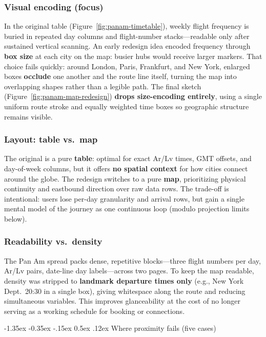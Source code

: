 \documentclass[11pt]{article}
\makeatletter
\renewcommand\subsection{\@startsection{subsection}{2}{\z@}%
  {-1.35ex \@plus -0.35ex \@minus -.15ex}%
  {0.5ex \@plus .12ex}%
  {\normalfont\large\bfseries}}
\makeatother
\begin{document}
\subsubsection{Visual encoding (focus)}

In the original table (Figure~\ref{fig:panam-timetable}), weekly flight frequency is buried in repeated day columns and flight-number stacks---readable only after sustained vertical scanning. An early redesign idea encoded frequency through \textbf{box size} at each city on the map: busier hubs would receive larger markers. That choice fails quickly: around London, Paris, Frankfurt, and New York, enlarged boxes \textbf{occlude} one another and the route line itself, turning the map into overlapping shapes rather than a legible path. The final sketch (Figure~\ref{fig:panam-map-redesign}) \textbf{drops size-encoding entirely}, using a single uniform route stroke and equally weighted time boxes so geographic structure remains visible.

\subsubsection{Layout: table vs.\ map}

The original is a pure \textbf{table}: optimal for exact Ar/Lv times, GMT offsets, and day-of-week columns, but it offers \textbf{no spatial context} for how cities connect around the globe. The redesign switches to a pure \textbf{map}, prioritizing physical continuity and eastbound direction over raw data rows. The trade-off is intentional: users lose per-day granularity and arrival rows, but gain a single mental model of the journey as one continuous loop (modulo projection limits below).

\subsubsection{Readability vs.\ density}

The Pan Am spread packs dense, repetitive blocks---three flight numbers per day, Ar/Lv pairs, date-line day labels---across two pages. To keep the map readable, density was stripped to \textbf{landmark departure times only} (e.g., New York Dept.\ 20:30 in a single box), giving whitespace along the route and reducing simultaneous variables. This improves glanceability at the cost of no longer serving as a working schedule for booking or connections.

\subsection{Where proximity fails (five cases)}
\end{document}
